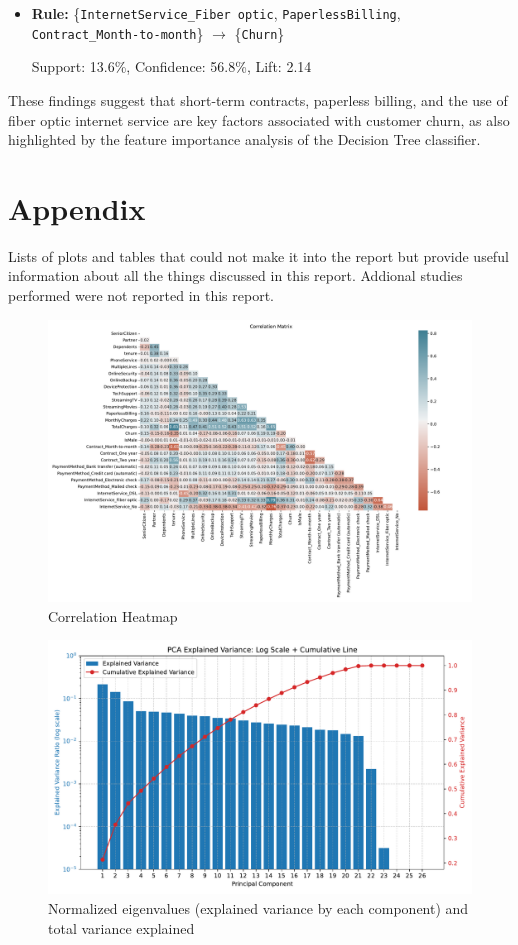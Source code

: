\documentclass[a4paper,11pt]{article}
\begin{document}
\begin{itemize}
\item \textbf{Rule:} \{\texttt{InternetService\_Fiber optic}, \texttt{PaperlessBilling}, \texttt{Contract\_Month-to-month}\} $\rightarrow$ \{\texttt{Churn}\}

Support: 13.6\%, Confidence: 56.8\%, Lift: 2.14
\end{itemize}

These findings suggest that short-term contracts, paperless billing, and the use of fiber optic internet service are key factors associated with customer churn, as also highlighted by the feature importance analysis of the Decision Tree classifier.


\section{Appendix}
Lists of plots and tables that could not make it into the report but provide useful information about all the things discussed in this report. Addional studies performed were not reported in this report.
\begin{figure}[H]
\centering
\includegraphics[width=\linewidth]{figures/understanding/correlation_matrix.pdf}
\caption{Correlation Heatmap}
\end{figure}
\begin{figure}[H]
\centering
\includegraphics[width=0.8\linewidth]{figures/understanding/pca_explained_variance.pdf}
\caption{Normalized eigenvalues (explained variance by each component) and total variance explained}
\label{fig:enter-label}
\end{figure}
\end{document}

